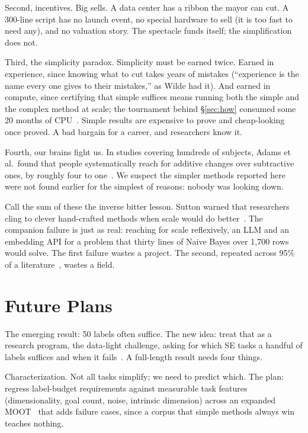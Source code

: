 \documentclass[10pt,conference]{IEEEtran}
\begin{document}
Second, incentives. Big sells. A data center has a ribbon the mayor
can cut. A 300-line script has no launch event, no special hardware to
sell (it is too fast to need any), and no valuation story. The
spectacle funds itself; the simplification does not.

Third, the simplicity paradox. Simplicity must be earned twice.
Earned in experience, since knowing what to cut takes years of
mistakes (``experience is the name every one gives to their
mistakes,'' as Wilde had it). And earned in compute, since certifying
that simple suffices means running both the simple and the complex
method at scale; the tournament behind \S\ref{sec:how} consumed some
20 months of CPU~\cite{ganguly26b}. Simple results are expensive to
prove and cheap-looking once proved. A bad bargain for a career, and
researchers know it.

Fourth, our brains fight us. In studies covering hundreds of
subjects, Adams et al.\ found that people systematically reach for
additive changes over subtractive ones, by roughly four to
one~\cite{adams21}. We suspect the simpler methods reported here were
not found earlier for the simplest of reasons: nobody was looking
down.

Call the sum of these the inverse bitter lesson. Sutton warned that
researchers cling to clever hand-crafted methods when scale would do
better~\cite{sutton19}. The companion failure is just as real:
reaching for scale reflexively, an LLM and an embedding API for a
problem that thirty lines of Naive Bayes over 1,700 rows would solve.
The first failure wastes a project. The second, repeated across 95\%
of a literature~\cite{menzies26}, wastes a field.

\section{Future Plans}
\label{sec:future}
The emerging result: 50 labels often suffice. The new idea: treat
that as a research program, the data-light challenge, asking for
which SE tasks a handful of labels suffices and when it
fails~\cite{ganguly26}. A full-length result needs four things.

Characterization. Not all tasks simplify; we need to predict which.
The plan: regress label-budget requirements against measurable task
features (dimensionality, goal count, noise, intrinsic dimension)
across an expanded MOOT~\cite{moot26} that adds failure cases, since
a corpus that simple methods always win teaches nothing.
\end{document}
